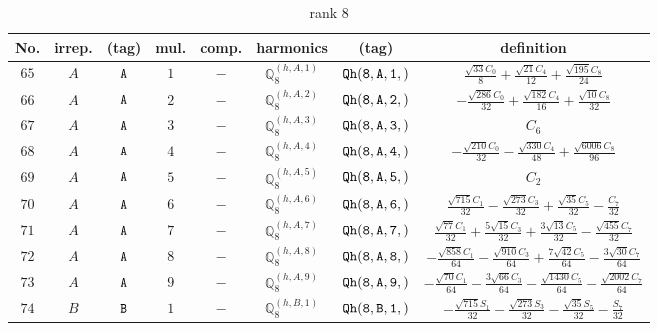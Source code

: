 \documentclass[fleqn,8pt]{jsarticle}
\begin{document}
\begin{table}[ht!]
\begin{center}
\caption{rank 8}
\renewcommand{\arraystretch}{1.3}
\begin{tabular}{cccccccc} \hline \hline
No. & irrep. & (tag) & mul. & comp. & harmonics & (tag) & definition \\ \hline
$ 65 $ & $ A $ & $ {\tt A} $ & $ 1 $ & $ - $ & $ \mathbb{Q}_{8}^{(h,A,1)} $ & $ {\tt Qh(8,A,1,)} $ & $ \frac{\sqrt{33} C_{0}}{8} + \frac{\sqrt{21} C_{4}}{12} + \frac{\sqrt{195} C_{8}}{24} $ \\
$ 66 $ & $ A $ & $ {\tt A} $ & $ 2 $ & $ - $ & $ \mathbb{Q}_{8}^{(h,A,2)} $ & $ {\tt Qh(8,A,2,)} $ & $ - \frac{\sqrt{286} C_{0}}{32} + \frac{\sqrt{182} C_{4}}{16} + \frac{\sqrt{10} C_{8}}{32} $ \\
$ 67 $ & $ A $ & $ {\tt A} $ & $ 3 $ & $ - $ & $ \mathbb{Q}_{8}^{(h,A,3)} $ & $ {\tt Qh(8,A,3,)} $ & $ C_{6} $ \\
$ 68 $ & $ A $ & $ {\tt A} $ & $ 4 $ & $ - $ & $ \mathbb{Q}_{8}^{(h,A,4)} $ & $ {\tt Qh(8,A,4,)} $ & $ - \frac{\sqrt{210} C_{0}}{32} - \frac{\sqrt{330} C_{4}}{48} + \frac{\sqrt{6006} C_{8}}{96} $ \\
$ 69 $ & $ A $ & $ {\tt A} $ & $ 5 $ & $ - $ & $ \mathbb{Q}_{8}^{(h,A,5)} $ & $ {\tt Qh(8,A,5,)} $ & $ C_{2} $ \\
$ 70 $ & $ A $ & $ {\tt A} $ & $ 6 $ & $ - $ & $ \mathbb{Q}_{8}^{(h,A,6)} $ & $ {\tt Qh(8,A,6,)} $ & $ \frac{\sqrt{715} C_{1}}{32} - \frac{\sqrt{273} C_{3}}{32} + \frac{\sqrt{35} C_{5}}{32} - \frac{C_{7}}{32} $ \\
$ 71 $ & $ A $ & $ {\tt A} $ & $ 7 $ & $ - $ & $ \mathbb{Q}_{8}^{(h,A,7)} $ & $ {\tt Qh(8,A,7,)} $ & $ \frac{\sqrt{77} C_{1}}{32} + \frac{5 \sqrt{15} C_{3}}{32} + \frac{3 \sqrt{13} C_{5}}{32} - \frac{\sqrt{455} C_{7}}{32} $ \\
$ 72 $ & $ A $ & $ {\tt A} $ & $ 8 $ & $ - $ & $ \mathbb{Q}_{8}^{(h,A,8)} $ & $ {\tt Qh(8,A,8,)} $ & $ - \frac{\sqrt{858} C_{1}}{64} - \frac{\sqrt{910} C_{3}}{64} + \frac{7 \sqrt{42} C_{5}}{64} - \frac{3 \sqrt{30} C_{7}}{64} $ \\
$ 73 $ & $ A $ & $ {\tt A} $ & $ 9 $ & $ - $ & $ \mathbb{Q}_{8}^{(h,A,9)} $ & $ {\tt Qh(8,A,9,)} $ & $ - \frac{\sqrt{70} C_{1}}{64} - \frac{3 \sqrt{66} C_{3}}{64} - \frac{\sqrt{1430} C_{5}}{64} - \frac{\sqrt{2002} C_{7}}{64} $ \\
$ 74 $ & $ B $ & $ {\tt B} $ & $ 1 $ & $ - $ & $ \mathbb{Q}_{8}^{(h,B,1)} $ & $ {\tt Qh(8,B,1,)} $ & $ - \frac{\sqrt{715} S_{1}}{32} - \frac{\sqrt{273} S_{3}}{32} - \frac{\sqrt{35} S_{5}}{32} - \frac{S_{7}}{32} $ \\

\end{tabular}
\end{center}
\end{table}
\end{document}
